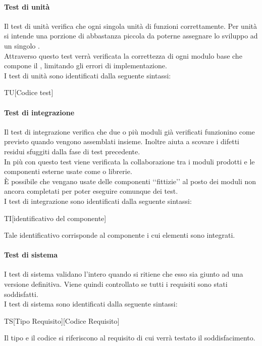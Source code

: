 			\paragraph{Test di unità}
				Il test di unità verifica che ogni singola unità di  funzioni correttamente. Per unità si intende una porzione di  abbastanza piccola da poterne assegnare lo sviluppo ad un singolo \PR. \\
				Attraverso questo test verrà verificata la correttezza di ogni modulo base che compone il , limitando gli errori di implementazione. \\
				I test di unità sono identificati dalla seguente sintassi:
				\begin{center}
					TU[Codice test]
				\end{center}
			\paragraph{Test di integrazione}
				Il test di integrazione verifica che due o più moduli già verificati funzionino come previsto quando vengono assemblati insieme. Inoltre aiuta a scovare i difetti residui sfuggiti dalla fase di test precedente. \\
				In più con questo test viene verificata la collaborazione tra i moduli prodotti e le componenti esterne usate come  o librerie. \\
				È possibile che vengano usate delle componenti ‘‘fittizie’’ al posto dei moduli non ancora completati per poter eseguire comunque dei test. \\
				I test di integrazione sono identificati dalla seguente sintassi:
				\begin{center}
					TI[identificativo del componente]
				\end{center}
				Tale identificativo corrisponde al componente i cui elementi sono integrati.
			\paragraph{Test di sistema}
				I test di sistema validano l'intero   quando si ritiene che esso sia giunto ad una versione definitiva. Viene quindi controllato se tutti i requisiti sono stati soddisfatti. \\
				I test di sistema sono identificati dalla seguente sintassi:
				\begin{center}
					TS[Tipo Requisito][Codice Requisito]
				\end{center}
				Il tipo e il codice si riferiscono al requisito di cui verrà testato il soddisfacimento.
